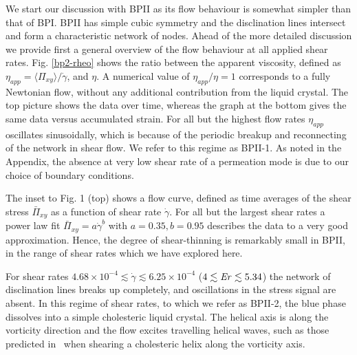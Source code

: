 \documentclass[8.5pt,twoside,twocolumn]{article}
\newcommand{\e}[1]{\times10^{#1}}
\newcommand{\gd}{\dot{\gamma}}
\begin{document}
We start our discussion with BPII as its flow behaviour is somewhat simpler 
than that of BPI. BPII has simple cubic symmetry and the disclination lines 
intersect and form a characteristic network of nodes.
Ahead of the more detailed discussion we provide first a general overview of the 
flow behaviour at all applied shear rates.
Fig. \ref{bp2-rheo} shows the ratio between the apparent viscosity, 
defined as 
$\eta_{app}=\langle \Pi_{xy} \rangle/\gd$, and $\eta$.
A numerical value of $\eta_{app}/\eta=1$ corresponds to a fully Newtonian flow,
without any additional contribution from the liquid crystal.
The top picture shows the data over time, whereas the graph at the bottom gives 
the same data versus accumulated strain.
For all but the highest flow rates $\eta_{app}$ oscillates sinusoidally, which
is because of the periodic breakup and reconnecting of the network in shear flow. 
We refer to this regime as BPII-1. As noted in the Appendix, the
absence at very low shear rate of a permeation mode is due to our
choice of boundary conditions.

The inset to Fig. 1 (top) shows a flow curve, defined as time averages of 
the shear stress $\bar{\Pi}_{xy}$ as a function of shear rate $\gd$.
For all but the largest shear rates a power law fit $\bar{\Pi}_{xy}=a \gd^b$ with 
$a=0.35, b=0.95$ describes the data to a very good approximation. 
Hence, the degree of shear-thinning is remarkably small in BPII, in
the range of shear rates which we have explored here.

For shear rates $4.68\e{-4}\lesssim\gd\lesssim6.25\e{-4}$ ($4\lesssim {\it Er} \lesssim 5.34$) the network of disclination lines
breaks up completely, and oscillations in the stress signal are absent.
In this regime of shear rates, to which we refer as BPII-2, the 
blue phase dissolves into a simple cholesteric liquid 
crystal. The helical axis is along the vorticity direction and
the flow excites travelling helical waves, such as those 
predicted in~\cite{Rey:1996a,Rey:1996b} when shearing a cholesteric helix along
the vorticity axis.
\end{document}
